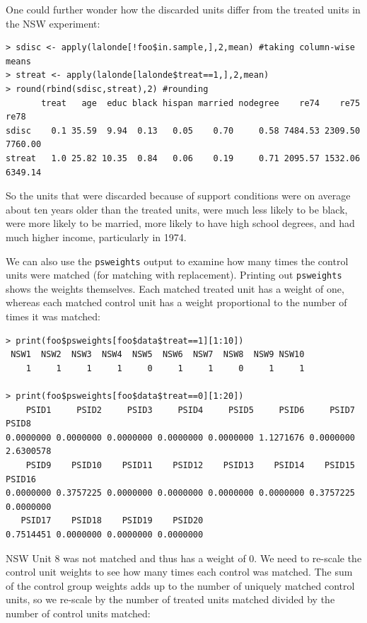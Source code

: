 \documentclass[oneside,letterpaper,titlepage]{article}
\begin{document}
One could further wonder how the discarded units differ from the
treated units in the NSW experiment:

\begin{verbatim}
> sdisc <- apply(lalonde[!foo$in.sample,],2,mean) #taking column-wise means
> streat <- apply(lalonde[lalonde$treat==1,],2,mean)
> round(rbind(sdisc,streat),2) #rounding
       treat   age  educ black hispan married nodegree    re74    re75    re78
sdisc    0.1 35.59  9.94  0.13   0.05    0.70     0.58 7484.53 2309.50 7760.00
streat   1.0 25.82 10.35  0.84   0.06    0.19     0.71 2095.57 1532.06 6349.14
\end{verbatim}

So the units that were discarded because of support conditions were on
average about ten years older than the treated units, were much less
likely to be black, were more likely to be married, more likely to have
high school degrees, and had much higher income, particularly in 1974.  

We can also use the {\tt psweights} output to examine how many times the control units were matched (for matching
with replacement).  Printing out {\tt psweights} shows the weights themselves. Each matched treated unit has a weight of one, whereas each matched control
unit has a weight proportional to the number of times it was matched:

\begin{verbatim}
> print(foo$psweights[foo$data$treat==1][1:10])
 NSW1  NSW2  NSW3  NSW4  NSW5  NSW6  NSW7  NSW8  NSW9 NSW10
    1     1     1     1     0     1     1     0     1     1

> print(foo$psweights[foo$data$treat==0][1:20])
    PSID1     PSID2     PSID3     PSID4     PSID5     PSID6     PSID7     PSID8
0.0000000 0.0000000 0.0000000 0.0000000 0.0000000 1.1271676 0.0000000 2.6300578
    PSID9    PSID10    PSID11    PSID12    PSID13    PSID14    PSID15    PSID16
0.0000000 0.3757225 0.0000000 0.0000000 0.0000000 0.0000000 0.3757225 0.0000000
   PSID17    PSID18    PSID19    PSID20
0.7514451 0.0000000 0.0000000 0.0000000
\end{verbatim}

NSW Unit 8 was not matched and thus has a weight of 0.  We need to re-scale the control unit weights to see how many times each control
was matched.  The sum of the control group weights adds up to the number of uniquely matched control units, so we re-scale by the number of treated units
matched divided by the number of control units matched:
\end{document}
